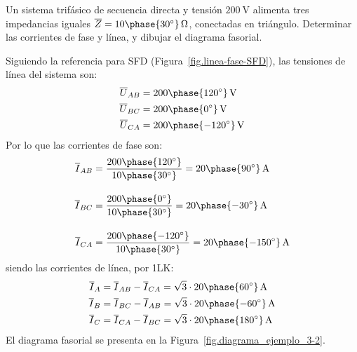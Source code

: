 	\vspace{4mm}
        \begin{example}\label{ej.3-2}
          Un sistema trifásico de secuencia directa y tensión
          $\qty{200}{\volt}$ alimenta tres impedancias iguales
          $\overline{Z}=10\phase{30^\circ}\,\Omega$, conectadas en
          triángulo. Determinar las corrientes de fase y línea, y
          dibujar el diagrama fasorial.

          \vspace{1mm} \hspace*{-5mm}\hrulefill
        
          \vspace{4mm}
    
          Siguiendo la referencia para SFD
          (Figura~\ref{fig.linea-fase-SFD}), las tensiones de línea
          del sistema son:
          \begin{align*}
            \overline{U}_{AB}&=200\phase{120^\circ}\,\si{\volt}\\
            \overline{U}_{BC}&=200\phase{0^\circ}\,\si{\volt}\\
            \overline{U}_{CA}&=200\phase{-120^\circ}\,\si{\volt}
          \end{align*}
          Por lo que las corrientes de fase son:
          \begin{align*}
            \overline{I}_{AB} &= \frac{200\phase{120^\circ}}{10\phase{30^\circ}} =20\phase{90^\circ} \,\si{\ampere} \\[10pt]
            \overline{I}_{BC} &= \frac{200\phase{0^\circ}}{10\phase{30^\circ}} = 20\phase{-30^\circ} \,\si{\ampere}\\[10pt]
            \overline{I}_{CA} &=\frac{200\phase{-120^\circ}}{10\phase{30^\circ}} = 20\phase{-150^\circ} \,\si{\ampere}
          \end{align*}
          siendo las corrientes de línea, por 1LK:
          \begin{align*}
            \overline{I}_A&= \overline{I}_{AB}-\overline{I}_{CA} = \sqrt{3}\cdot 20\phase{60^\circ}\,\si{\ampere}\\
            \overline{I}_B&= \overline{I}_{BC}-\overline{I}_{AB} = \sqrt{3}\cdot 20\phase{-60^\circ}\,\si{\ampere}\\
            \overline{I}_C&= \overline{I}_{CA}-\overline{I}_{BC} = \sqrt{3}\cdot 20\phase{180^\circ}\,\si{\ampere}
          \end{align*}
          El diagrama fasorial se presenta en la
          Figura~\ref{fig.diagrama_ejemplo_3-2}.

\end{example}
